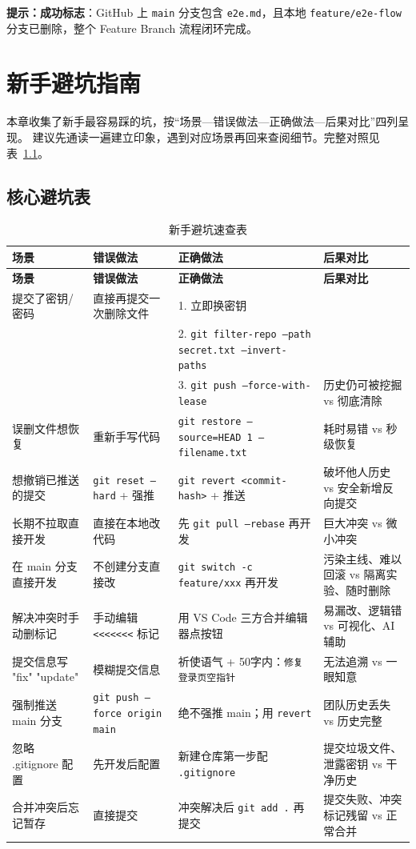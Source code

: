 \documentclass[12pt,a4paper,openany]{ctexbook}
\begin{document}
\noindent\textbf{提示：}\textbf{成功标志}：GitHub 上 \texttt{main} 分支包含 \texttt{e2e.md}，且本地 \texttt{feature/e2e-flow} 分支已删除，整个 Feature Branch 流程闭环完成。

\chapter{新手避坑指南}

本章收集了新手最容易踩的坑，按“场景—错误做法—正确做法—后果对比”四列呈现。
建议先通读一遍建立印象，遇到对应场景再回来查阅细节。完整对照见表~\ref{tab:pitfalls}。

\section{核心避坑表}

\begin{longtable}{p{2.8cm} p{3.5cm} p{3.5cm} p{4.5cm}}
\caption{新手避坑速查表}\label{tab:pitfalls}\\
\toprule
\textbf{场景} & \textbf{错误做法} & \textbf{正确做法} & \textbf{后果对比} \\
\midrule
\endfirsthead
\toprule
\textbf{场景} & \textbf{错误做法} & \textbf{正确做法} & \textbf{后果对比} \\
\midrule
\endhead
提交了密钥/密码 & 直接再提交一次删除文件 & 1. 立即换密钥\\
& & 2. \texttt{git filter-repo --path secret.txt --invert-paths}\\
& & 3. \texttt{git push --force-with-lease} & 历史仍可被挖掘 vs 彻底清除 \\
误删文件想恢复 & 重新手写代码 & \texttt{git restore --source=HEAD~1 -- filename.txt} & 耗时易错 vs 秒级恢复 \\
想撤销已推送的提交 & \texttt{git reset --hard} + 强推 & \texttt{git revert <commit-hash>} + 推送 & 破坏他人历史 vs 安全新增反向提交 \\
长期不拉取直接开发 & 直接在本地改代码 & 先 \texttt{git pull --rebase} 再开发 & 巨大冲突 vs 微小冲突 \\
在 main 分支直接开发 & 不创建分支直接改 & \texttt{git switch -c feature/xxx} 再开发 & 污染主线、难以回滚 vs 隔离实验、随时删除 \\
解决冲突时手动删标记 & 手动编辑 \texttt{<<<<<<<} 标记 & 用 VS Code 三方合并编辑器点按钮 & 易漏改、逻辑错 vs 可视化、AI 辅助 \\
提交信息写 "fix" "update" & 模糊提交信息 & 祈使语气 + 50字内：\texttt{修复登录页空指针} & 无法追溯 vs 一眼知意 \\
强制推送 main 分支 & \texttt{git push --force origin main} & 绝不强推 main；用 \texttt{revert} & 团队历史丢失 vs 历史完整 \\
忽略 .gitignore 配置 & 先开发后配置 & 新建仓库第一步配 \texttt{.gitignore} & 提交垃圾文件、泄露密钥 vs 干净历史 \\
合并冲突后忘记暂存 & 直接提交 & 冲突解决后 \texttt{git add .} 再提交 & 提交失败、冲突标记残留 vs 正常合并 \\
\bottomrule
\end{longtable}
\end{document}
